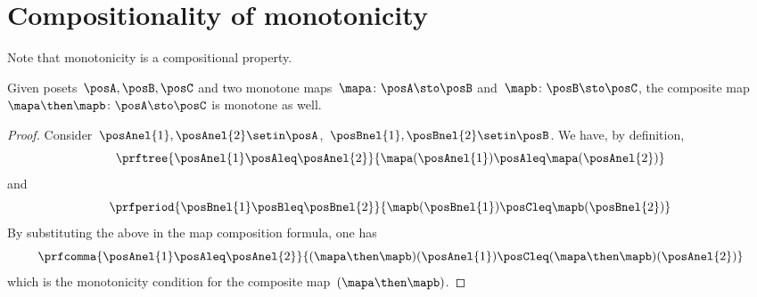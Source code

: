 
\section{Compositionality of monotonicity}
Note that monotonicity is a compositional property.
\begin{lemma}
    Given posets~$\posA,\posB,\posC$ and two monotone maps~$\mapa\colon \posA \sto \posB$ and~$\mapb\colon \posB \sto \posC$, the composite map~$\mapa\then \mapb\colon \posA \sto \posC$ is monotone as well.
\end{lemma}
\begin{proof}
    Consider~$\posAnel{1},\posAnel{2} \setin \posA$,~$\posBnel{1},\posBnel{2}\setin \posB$.
    We have, by definition,
    \begin{equation*}
        \prftree{\posAnel{1}\posAleq \posAnel{2}}{\mapa(\posAnel{1})\posAleq \mapa(\posAnel{2})}
    \end{equation*}
    and
    \begin{equation*}
        \prfperiod{\posBnel{1}\posBleq \posBnel{2}}{\mapb(\posBnel{1})\posCleq \mapb(\posBnel{2})}
    \end{equation*}
    By substituting the above in the map composition formula, one has
    \begin{equation*}
        \prfcomma{\posAnel{1}\posAleq \posAnel{2} }{ (\mapa\then \mapb)(\posAnel{1}) \posCleq (\mapa\then \mapb)(\posAnel{2})}
    \end{equation*}
    which is the monotonicity condition for the composite map~$(\mapa\then \mapb)$.
\end{proof}
